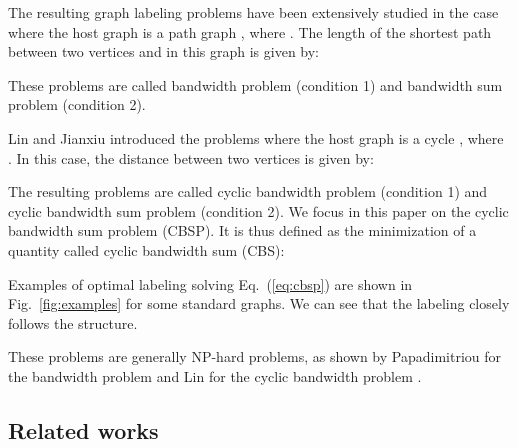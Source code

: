 \documentclass{scrartcl}
\theoremstyle{plain}
\newcommand{\cbs}{CBS}
\newcommand{\cbsp}{CBSP}
\begin{document}
The resulting graph labeling problems have been extensively studied in the case 
where the host graph is a path graph , where . The length of the shortest path between two vertices  
and  in this graph is given by:

These problems are called bandwidth problem (condition 1) and bandwidth sum 
problem (condition 2).

Lin \cite{Lin1994} and Jianxiu \cite{Jianxiu2001} introduced the problems where 
the host graph is a cycle , where . In this case, the distance 
between two vertices  is given by:


The resulting problems are called cyclic bandwidth problem (condition 1) and 
cyclic bandwidth sum problem (condition 2). We focus in this paper on the cyclic 
bandwidth sum problem (\cbsp{}). It is thus defined as the minimization of a 
quantity called cyclic bandwidth sum (\cbs{}):


Examples of optimal labeling solving Eq.~(\ref{eq:cbsp}) are shown in 
Fig.~\ref{fig:examples} for some standard graphs. We can see that the labeling 
closely follows the structure.

These problems are generally NP-hard problems, as shown by Papadimitriou for the 
bandwidth problem \cite{Papadimitriou1976}  and Lin  for the cyclic bandwidth 
problem \cite{Lin1994}.

\subsection{Related works}
\end{document}

